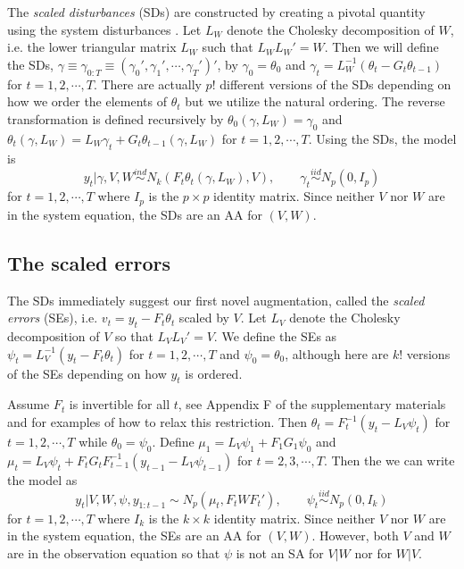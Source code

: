 \documentclass[12pt]{article}
\begin{document}
The {\it scaled disturbances} (SDs) are constructed by creating a pivotal quantity using the system disturbances \citep{fruhwirth2004efficient}. Let $L_W$ denote the Cholesky decomposition of $W$, i.e. the lower triangular matrix $L_W$ such that $L_WL_W' =W$. Then we will define the SDs, $\gamma\equiv\gamma_{0:T}\equiv(\gamma_0',\gamma_1',\cdots,\gamma_T')'$, by $\gamma_0=\theta_0$ and $\gamma_t = L_W^{-1}(\theta_t-G_t\theta_{t-1})$ for $t=1,2,\cdots,T$. There are actually $p!$ different versions of the SDs depending on how we order the elements of $\theta_t$ but we utilize the natural ordering. 
The reverse transformation is defined recursively by $\theta_0(\gamma,L_W)=\gamma_0$ and $\theta_t(\gamma,L_W)=L_W\gamma_t + G_t\theta_{t-1}(\gamma,L_W)$ for $t=1,2,\cdots,T$. 
Using the SDs, the model is \vspace{-.3cm}
\[ y_t|\gamma,V,W  \stackrel{ind}{\sim} N_k\left(F_t\theta_t(\gamma,L_W), V\right), \qquad \gamma_t  \stackrel{iid}{\sim}N_p(0,I_p) \label{dlmdistmodel}
\]
for $t=1,2,\cdots,T$ where $I_p$ is the $p\times p$ identity matrix. Since neither $V$ nor $W$ are in the system equation, the SDs are an AA for $(V,W)$. 

\subsection{The scaled errors}\label{sec:DAs:error}
The SDs immediately suggest our first novel augmentation, called the {\it scaled errors} (SEs), i.e. $v_t=y_t - F_t\theta_t$ scaled by $V$. Let $L_V$ denote the Cholesky decomposition of $V$ so that $L_VL_V'=V$. We define the SEs as $\psi_t = L_V^{-1}(y_t - F_t\theta_t)$ for $t=1,2,\cdots,T$ and $\psi_0 = \theta_0$, although here are $k!$ versions of the SEs depending on how $y_t$ is ordered.

Assume $F_t$ is invertible for all $t$, see Appendix F of the supplementary materials and \citet{simpson2014app} for examples of how to relax this restriction. Then $\theta_t = F_t^{-1}(y_t - L_V\psi_t)$ for $t=1,2,\cdots,T$ while $\theta_0=\psi_0$. Define $\mu_1 = L_V\psi_1 + F_1G_1\psi_0$ and $\mu_t =L_V\psi_t + F_tG_tF_{t-1}^{-1}(y_{t-1} - L_{V}\psi_{t-1})$ for $t=2,3,\cdots,T$. Then the we can write the model as \vspace{-.3cm}
\[
  y_t|V,W,\psi,y_{1:t-1} \sim N_p(\mu_t, F_tWF_t'), \qquad \psi_t  \stackrel{iid}{\sim} N_p(0,I_k)
\]
for $t=1,2,\cdots,T$ where $I_k$ is the $k\times k$ identity matrix. Since neither $V$ nor $W$ are in the system equation, the SEs are an AA for $(V,W)$. However, both $V$ and $W$ are in the observation equation so that $\psi$ is not an SA for $V|W$ nor for $W|V$.
\end{document}
